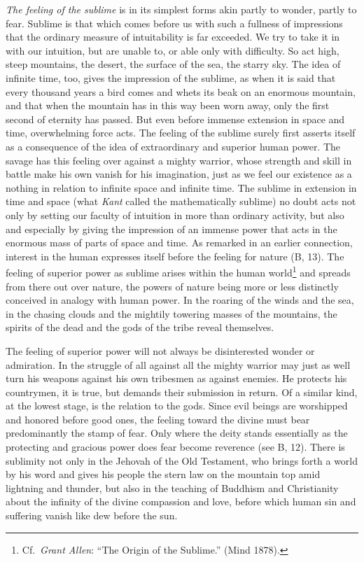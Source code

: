 \documentclass[12pt,a4paper]{book}
\newcommand{\opage}[1]{\marginnote{\footnotesize\textit{[#1]}}}
\begin{document}
\emph{The feeling of the sublime} is in its simplest forms akin partly
to wonder, partly to fear. Sublime is that which comes before us with
such a fullness of impressions that the ordinary measure of
intuitability is far exceeded. We try to take it in with our intuition,
but are unable to, or able only with difficulty. So act high, steep
mountains, the desert, the surface of the sea, the starry sky. The idea
of infinite time, too, gives the impression of the sublime, as when it
is said that every thousand years a bird comes and whets its beak on an
enormous mountain, and that when the mountain has in this way been worn
away, only the first second of eternity has passed. But even before
immense extension in space and time, overwhelming force acts. The
feeling of the sublime surely first asserts itself as a consequence of
the idea of extraordinary and superior human power. The savage has this
feeling over against a mighty warrior, whose strength and skill in
battle make his own vanish for his imagination, just as we feel our
existence as a nothing in relation to infinite space and infinite time.
The sublime in extension in time and space (what \emph{Kant} called the
mathematically sublime) no doubt acts not only by setting our faculty of
intuition in more than ordinary activity, but also and especially by
giving the impression of an immense
\opage{342}power that acts in the enormous mass of parts of space and
time. As remarked in an earlier connection, interest in the human
expresses itself before the feeling for nature (B, 13). The feeling of
superior power as sublime arises within the human
world\footnote{Cf.\ \emph{Grant Allen}: ``The Origin of the Sublime.''
(Mind 1878).} and spreads from there out over nature, the powers of
nature being more or less distinctly conceived in analogy with human
power. In the roaring of the winds and the sea, in the chasing clouds
and the mightily towering masses of the mountains, the spirits of the
dead and the gods of the tribe reveal themselves.

The feeling of superior power will not always be disinterested wonder
or admiration. In the struggle of all against all the mighty warrior
may just as well turn his weapons against his own tribesmen as against
enemies. He protects his countrymen, it is true, but demands their
submission in return. Of a similar kind, at the lowest stage, is the
relation to the gods. Since evil beings are worshipped and honored
before good ones, the feeling toward the divine must bear predominantly
the stamp of fear. Only where the deity stands essentially as the
protecting and gracious power does fear become reverence (see B, 12).
There is sublimity not only in the Jehovah of the Old Testament, who
brings forth a world by his word and gives his people the stern law on
the mountain top amid lightning and thunder, but also in the teaching of
Buddhism and Christianity about the infinity of the divine compassion
and love, before which human sin and suffering vanish like dew before
the sun.
\end{document}
